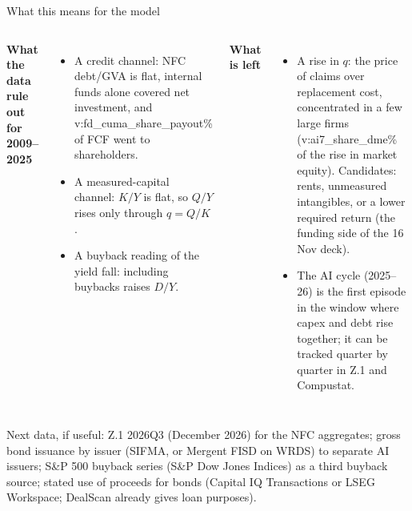 \documentclass[aspectratio=169,10pt,t]{beamer}
\newcommand{\val}[1]{\csname v:#1\endcsname}
\begin{document}
\begin{frame}{What this means for the model}
\vspace{0.15cm}
\begin{columns}[T]
{\small
\textbf{What the data rule out for 2009--2025}
\begin{itemize}\setlength{\itemsep}{0.12cm}
\item A credit channel: NFC debt/GVA is flat, internal funds alone covered net investment, and \val{fd_cuma_share_payout}\% of FCF went to shareholders.
\item A measured-capital channel: $K/Y$ is flat, so $Q/Y$ rises only through $q=Q/K$.
\item A buyback reading of the yield fall: including buybacks raises $D/Y$.
\end{itemize}}
{\small
\textbf{What is left}
\begin{itemize}\setlength{\itemsep}{0.12cm}
\item A rise in $q$: the price of claims over replacement cost, concentrated in a few large firms (\val{ai7_share_dme}\% of the rise in market equity). Candidates: rents, unmeasured intangibles, or a lower required return (the funding side of the 16 Nov deck).
\item The AI cycle (2025--26) is the first episode in the window where capex and debt rise together; it can be tracked quarter by quarter in Z.1 and Compustat.
\end{itemize}}
\end{columns}
\vfill
{\small\textcolor{inksec}{Next data, if useful: Z.1 2026Q3 (December 2026) for the NFC aggregates; gross bond issuance by issuer (SIFMA, or Mergent FISD on WRDS) to separate AI issuers; S\&P 500 buyback series (S\&P Dow Jones Indices) as a third buyback source; stated use of proceeds for bonds (Capital IQ Transactions or LSEG Workspace; DealScan already gives loan purposes).}}
\vspace{0.4cm}
\end{frame}
\end{document}
